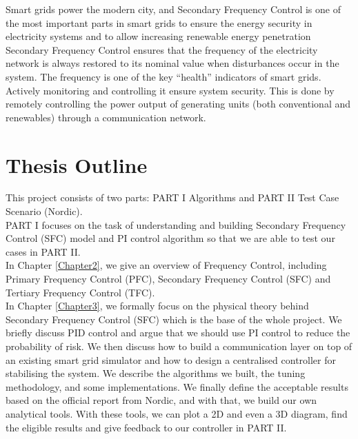 \documentclass{report}
\begin{document}
Smart grids power the modern city, and Secondary Frequency Control is one of the most important parts in smart grids to ensure the energy security in electricity systems and to allow increasing renewable energy penetration\\

Secondary Frequency Control ensures that the frequency of the electricity network is always restored to its nominal value when disturbances occur in the system. The frequency is one of the key “health” indicators of smart grids. Actively monitoring and controlling it ensure system security. This is done by remotely controlling the power output of generating units (both conventional and renewables) through a communication network.\\


\section{Thesis Outline} %
This project consists of two parts: PART I Algorithms and PART II Test Case Scenario (Nordic).\\

PART I focuses on the task of understanding and building Secondary Frequency Control (SFC) model and PI control algorithm so that we are able to test our cases in PART II.\\


In Chapter \textcolor{red}{\ref{Chapter2}}, we give an overview of Frequency Control, including Primary Frequency Control (PFC), Secondary Frequency Control (SFC) and Tertiary Frequency Control (TFC).\\

In Chapter \textcolor{red}{\ref{Chapter3}}, we formally focus on the physical theory behind Secondary Frequency Control (SFC) which is the base of the whole project. We briefly discuss PID control and argue that we should use PI control to reduce the probability of risk. We then discuss how to build a communication layer on top of an existing smart grid simulator and how to design a centralised controller for stabilising the system. We describe the algorithms we built, the tuning methodology, and some implementations. We finally define the acceptable results based on the official report from Nordic, and with that, we build our own analytical tools. With these tools, we can plot a 2D and even a 3D diagram, find the eligible results and give feedback to our controller in PART II.\\
\end{document}
